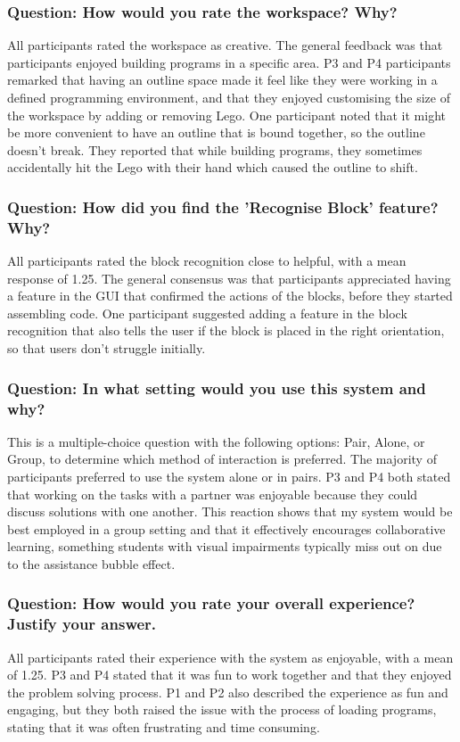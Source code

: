 \documentclass[oneside,%
                    author={Malak Hajji},
                    degree={BSc},
                    title={Designing An Accessible Ozobot Programming Platform for Students},
                  subtitle={With Mixed Visual Abilities}]{dissertation}
\begin{document}
\subsubsection{Question: How would you rate the workspace? Why?}
All participants rated the workspace as creative. The general feedback was that participants enjoyed building programs in a specific area. P3 and P4 participants remarked that having an outline space made it feel like they were working in a defined programming environment, and that they enjoyed customising the size of the workspace by adding or removing Lego. One participant noted that it might be more convenient to have an outline that is bound together, so the outline doesn't break. They reported that while building programs, they sometimes accidentally hit the Lego with their hand which caused the outline to shift. 

\subsubsection{Question: How did you find the 'Recognise Block' feature? Why?}
All participants rated the block recognition close to helpful, with a mean response of 1.25. The general consensus was that participants appreciated having a feature in the GUI that confirmed the actions of the blocks, before they started assembling code. One participant suggested adding a feature in the block recognition that also tells the user if the block is placed in the right orientation, so that users don't struggle initially.


\subsubsection{Question: In what setting would you use this system and why?}
This is a multiple-choice question with the following options: Pair, Alone, or Group, to determine which method of interaction is preferred. 
The majority of participants preferred to use the system alone or in pairs. P3 and P4 both stated that working on the tasks with a partner was enjoyable because they could discuss solutions with one another. This reaction shows that my system would be best employed in a group setting and that it effectively encourages collaborative learning, something students with visual impairments typically miss out on due to the assistance bubble effect.

\subsubsection{Question: How would you rate your overall experience? Justify your answer.}
All participants rated their experience with the system as enjoyable, with a mean of 1.25.
P3 and P4 stated that it was fun to work together and that they enjoyed the problem solving process. P1 and P2 also described the experience as fun and engaging, but they both raised the issue with the process of loading programs, stating that it was often frustrating and time consuming. 
\end{document}

